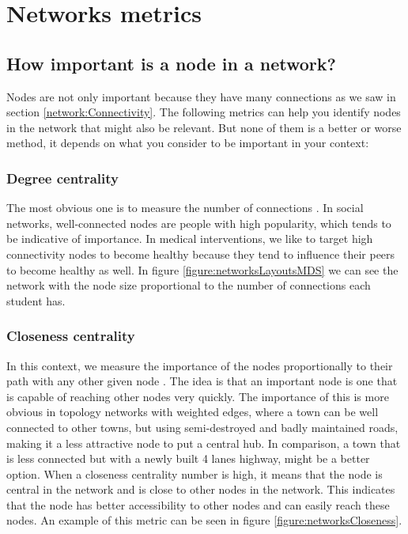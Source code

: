     \newpage

\section{Networks metrics}

\subsection{How important is a node in a network?}


Nodes are not only important because they have many connections as we saw in section \ref{network:Connectivity}. The following metrics can help you identify nodes in the network that might also be relevant. But none of them is a better or worse method, it depends on what you consider to be important in your context:

\subsubsection{Degree centrality}

The most obvious one is to measure the number of connections \cite{Freeman1978}. In social networks, well-connected nodes are people with high popularity, which tends to be indicative of importance. In medical interventions, we like to target high connectivity nodes to become healthy because they tend to influence their peers to become healthy as well. In figure \ref{figure:networksLayoutsMDS} we can see the network with the node size proportional to the number of connections each student has.

\subsubsection{Closeness centrality}

In this context, we measure the importance of the nodes proportionally to their path with any other given node \cite{Freeman1978}. The idea is that an important node is one that is capable of reaching other nodes very quickly. The importance of this is more obvious in topology networks with weighted edges, where a town can be well connected to other towns, but using semi-destroyed and badly maintained roads, making it a less attractive node to put a central hub. In comparison, a town that is less connected but with a newly built 4 lanes highway, might be a better option. When a closeness centrality number is high, it means that the node is central in the network and is close to other nodes in the network. This indicates that the node has better accessibility to other nodes and can easily reach these nodes. An example of this metric can be seen in figure \ref{figure:networksCloseness}.

